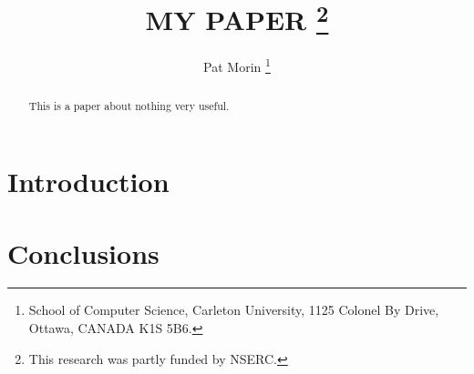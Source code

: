 \documentclass[lotsofwhite,charterfonts]{patmorin}
\title{\MakeUppercase{My Paper}%
	\thanks{This research was partly funded by NSERC.}}
\author{Pat Morin%
	\thanks{School of Computer Science, Carleton University, 
		1125 Colonel By Drive, Ottawa, CANADA K1S 5B6.}}
\date{}
\begin{document}
\maketitle
\begin{abstract}
This is a paper about nothing very useful.
\end{abstract}

\section{Introduction}


\section{Conclusions}




\end{document}
